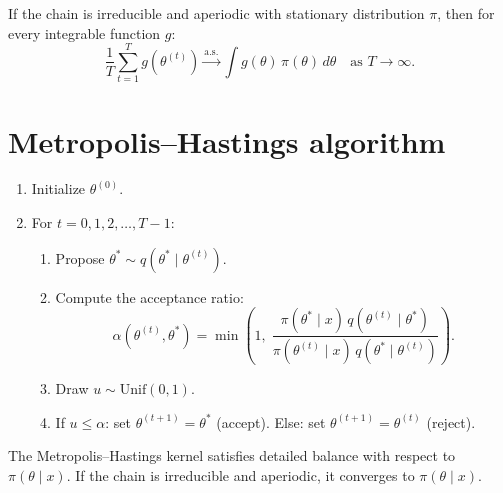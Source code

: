 \begin{theorem}
If the chain is irreducible and aperiodic with stationary distribution
$\pi$, then for every integrable function $g$:
\[
  \frac{1}{T}\sum_{t=1}^T g(\theta^{(t)}) \xrightarrow{\text{a.s.}}
  \int g(\theta)\,\pi(\theta)\,d\theta
  \quad \text{as } T \to \infty.
\]
\end{theorem}

\section{Metropolis--Hastings algorithm}

\begin{algorithme}[title=\textbf{Metropolis--Hastings algorithm}]
\begin{enumerate}
  \item Initialize $\theta^{(0)}$.
  \item For $t = 0, 1, 2, \ldots, T-1$:
  \begin{enumerate}
    \item Propose $\theta^* \sim q(\theta^* \mid \theta^{(t)})$.
    \item Compute the acceptance ratio:
    \[
      \alpha(\theta^{(t)}, \theta^*) = \min\!\left(1,\;
      \frac{\pi(\theta^* \mid x)\,q(\theta^{(t)} \mid \theta^*)}
           {\pi(\theta^{(t)} \mid x)\,q(\theta^* \mid \theta^{(t)})}\right).
    \]
    \item Draw $u \sim \text{Unif}(0, 1)$.
    \item If $u \leq \alpha$: set $\theta^{(t+1)} = \theta^*$ (accept).
          Else: set $\theta^{(t+1)} = \theta^{(t)}$ (reject).
  \end{enumerate}
\end{enumerate}
\end{algorithme}

\begin{theorem}
The Metropolis--Hastings kernel satisfies detailed balance with
respect to $\pi(\theta \mid x)$. If the chain is irreducible and
aperiodic, it converges to $\pi(\theta \mid x)$.
\end{theorem}


